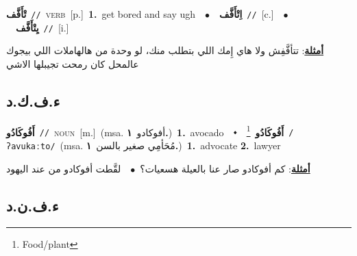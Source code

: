 \documentclass[10pt,a4paper,twoside]{article} %
\begin{document}
\begin{multicols}{2}
{\setlength\topsep{0pt}\textbf{\foreignlanguage{arabic}{تْأَفَّف}}\ {\color{gray}\texttt{//}\color{black}}\ \textsc{verb}\ [p.]\ \textbf{1.}~get bored and say ugh\ \ $\bullet$\ \ \setlength\topsep{0pt}\textbf{\foreignlanguage{arabic}{اِتْأَفَّف}}\ {\color{gray}\texttt{//}\color{black}}\ [c.]\ \ $\bullet$\ \ \setlength\topsep{0pt}\textbf{\foreignlanguage{arabic}{يِتْأَفَّف}}\ {\color{gray}\texttt{//}\color{black}}\ [i.]\  \begin{flushright}\color{gray}\foreignlanguage{arabic}{\textbf{\underline{\foreignlanguage{arabic}{أمثلة}}}: تتأفَّفِش ولا هاي إِمك اللي بتطلب منك، لو وحدة من هالهاملات اللي بيجوك عالمحل كان رمحت تجيبلها الاشي}\end{flushright}\color{black}} \vspace{2mm}

\vspace{-3mm}
\subsection*{\color{blue}\foreignlanguage{arabic}{ء.ف.ك.د}\color{blue}{ (ntws)}} 

{\setlength\topsep{0pt}\textbf{\foreignlanguage{arabic}{أَفُوكَادُو}}\ {\color{gray}\texttt{//}\color{black}}\ \textsc{noun}\ [m.]\ \color{gray}(msa. \foreignlanguage{arabic}{أفوكادو}~\foreignlanguage{arabic}{\textbf{١.}})\color{black}\ \textbf{1.}~avocado\ \ $\smblkdiamond$\ \ \setlength\topsep{0pt}\textbf{\foreignlanguage{arabic}{أَفُوكَادُو}}\ \footnote{Food/plant}\ {\color{gray}\texttt{/ʔavukaːto/}\color{black}}\ \color{gray}(msa. \foreignlanguage{arabic}{مُحَأمِي صغير بالسن}~\foreignlanguage{arabic}{\textbf{١.}})\color{black}\ \textbf{1.}~advocate  \textbf{2.}~lawyer\  \begin{flushright}\color{gray}\foreignlanguage{arabic}{\textbf{\underline{\foreignlanguage{arabic}{أمثلة}}}: كم أفوكادو صار عنا بالعيلة هسعيات؟\ $\bullet$\ \  لقَّطت أفوكادو من عند اليهود}\end{flushright}\color{black}} \vspace{2mm}

\vspace{-3mm}
\subsection*{\color{blue}\foreignlanguage{arabic}{ء.ف.ن.د}\color{blue}{ (ntws)}} 


\end{multicols}
\end{document}
